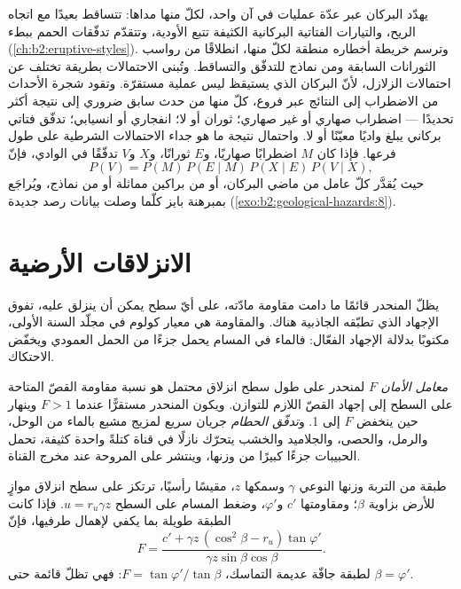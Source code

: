 يهدّد البركان عبر عدّة عمليات في آن واحد، لكلّ منها مداها:  تتساقط بعيدًا
مع اتجاه الريح، والتيارات الفتاتية البركانية الكثيفة  تتبع الأودية، وتتقدّم تدفّقات الحمم ببطء
(\cref{ch:b2:eruptive-styles}). وترسم خريطة أخطاره منطقة لكلّ منها، انطلاقًا من رواسب الثورانات
السابقة ومن نماذج للتدفّق والتساقط. وتُبنى الاحتمالات بطريقة تختلف عن احتمالات
الزلازل، لأنّ البركان الذي يستيقظ ليس عملية مستقرّة. وتقود شجرة الأحداث
من الاضطراب إلى النتائج عبر فروع، كلّ منها من حدث سابق ضروري إلى نتيجة
أكثر تحديدًا --- اضطراب صهاري أو غير صهاري؛ ثوران أو لا؛ انفجاري أو انسيابي؛ تدفّق فتاتي بركاني
يبلغ واديًا معيّنًا أو لا. واحتمال نتيجة ما هو جداء الاحتمالات الشرطية
على طول فرعها. فإذا كان $M$ اضطرابًا صهاريًا، و$E$ ثورانًا، و$X$  و$V$ تدفّقًا في الوادي، فإنّ
\begin{equation*}
P(V) = P(M) \, P(E \mid M) \, P(X \mid E) \, P(V \mid X),
\end{equation*}
حيث يُقدَّر كلّ عامل من ماضي البركان، أو من براكين مماثلة أو من نماذج، ويُراجَع
بمبرهنة بايز كلّما وصلت بيانات رصد جديدة (\cref{exo:b2:geological-hazards:8}).

\section{الانزلاقات الأرضية}\label{sec:b2:geological-hazards:landslides}

يظلّ المنحدر قائمًا ما دامت مقاومة مادّته، على أيّ سطح يمكن أن ينزلق عليه،
تفوق الإجهاد الذي تطبّقه الجاذبية هناك. والمقاومة هي معيار كولوم في مجلّد السنة
الأولى، مكتوبًا بدلالة الإجهاد الفعّال: فالماء في المسام يحمل جزءًا من الحمل العمودي
ويخفّض الاحتكاك.

\begin{definition}\label{def:b2:geological-hazards:slope}
\emph{معامل الأمان} $F$ لمنحدر على طول سطح انزلاق محتمل
هو نسبة مقاومة القصّ المتاحة على السطح إلى إجهاد القصّ اللازم
للتوازن. ويكون المنحدر مستقرًّا عندما $F > 1$ وينهار حين ينخفض $F$ إلى 1. و\emph{تدفّق الحطام}
جريان سريع لمزيج مشبع بالماء من الوحل، والرمل، والحصى، والجلاميد والخشب
يتحرّك نازلًا في قناة كتلةً واحدة كثيفة، تحمل الحبيبات جزءًا كبيرًا من وزنها، وينتشر
على المروحة عند مخرج القناة.
\end{definition}

\begin{proposition}\label{prop:b2:geological-hazards:infinite-slope}
طبقة من التربة وزنها النوعي $\gamma$ وسمكها $z$، مقيسًا رأسيًا، ترتكز على سطح انزلاق
موازٍ للأرض بزاوية $\beta$؛ ومقاومتها $c'$ و$\varphi'$، وضغط
المسام على السطح $u = r_u \gamma z$. فإذا كانت الطبقة طويلة بما يكفي
لإهمال طرفيها، فإنّ
\begin{equation}
F = \frac{c' + \gamma z\,(\cos^2\beta - r_u)\tan\varphi'}{\gamma z \sin\beta\cos\beta}.
\label{eq:b2:geological-hazards:infinite-slope}
\end{equation}
لطبقة جافّة عديمة التماسك، $F = \tan\varphi'/\tan\beta$: فهي تظلّ قائمة حتى $\beta = \varphi'$.
\end{proposition}


